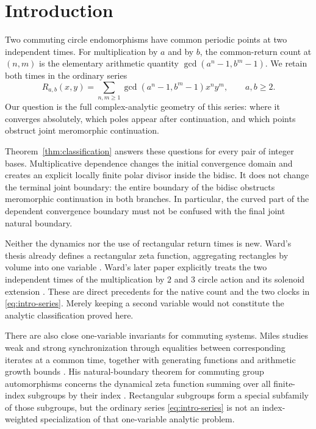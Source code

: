 \section{Introduction}

Two commuting circle endomorphisms have common periodic points at two
independent times. For multiplication by \(a\) and by \(b\), the
common-return count at \((n,m)\) is the elementary arithmetic quantity
\(\gcd(a^n-1,b^m-1)\). We retain both times in the ordinary series
\begin{equation}\label{eq:intro-series}
R_{a,b}(x,y)=
\sum_{n,m\geq1}\gcd(a^n-1,b^m-1)x^ny^m,\qquad a,b\geq2.
\end{equation}
Our question is the full complex-analytic geometry of this series:
where it converges absolutely, which poles appear after continuation,
and which points obstruct joint meromorphic continuation.

Theorem~\ref{thm:classification} answers these questions for every pair
of integer bases. Multiplicative dependence changes the initial
convergence domain and creates an explicit locally finite polar
divisor inside the bidisc. It does not change the terminal joint
boundary: the entire boundary of the bidisc obstructs meromorphic
continuation in both branches. In particular, the curved part of
the dependent convergence boundary must not be confused with the
final joint natural boundary.

Neither the dynamics nor the use of rectangular return times is new.
Ward's thesis already defines a rectangular zeta function, aggregating
rectangles by volume into one variable
\citep[Chapter IV, Definition IV.1.2]{ward1989}. Ward's later paper
explicitly treats the two independent times of the multiplication
by \(2\) and \(3\) circle action and its solenoid extension
\citep[Example 3.1]{ward1992}. These are direct precedents for the
native count and the two clocks in \eqref{eq:intro-series}.
Merely keeping a second variable would not constitute the analytic
classification proved here.

There are also close one-variable invariants for commuting systems.
Miles studies weak and strong synchronization through equalities
between corresponding iterates at a common time, together with
generating functions and arithmetic growth bounds \citep{miles2013}.
His natural-boundary theorem for commuting group automorphisms concerns
the dynamical zeta function summing over all finite-index subgroups
by their index \citep{miles2015}. Rectangular subgroups form a special
subfamily of those subgroups, but the ordinary series
\eqref{eq:intro-series} is not an index-weighted specialization of
that one-variable analytic problem.

